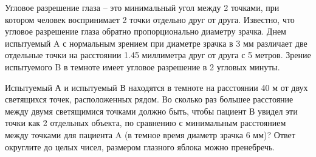 
Угловое разрешение глаза – это минимальный угол
между 2 точками, при котором человек воспринимает 2 точки отдельно друг от
друга. Известно, что угловое разрешение глаза обратно пропорционально диаметру
зрачка. Днем испытуемый A с нормальным зрением при диаметре зрачка в 3  мм
различает две отдельные точки на расстоянии 1.45  миллиметра друг от друга с 5 
метров. Зрение испытуемого B в темноте имеет угловое разрешение в 2  угловых
минуты.

Испытуемый А и испытуемый В находятся в темноте на
расстоянии 40  м от двух светящихся точек, расположенных рядом.  Во сколько раз большее расстояние между двумя
светящимися точками должно быть, чтобы пациент В увидел эти точки как 2
отдельных объекта, по сравнению с минимальным расстоянием между точками для
пациента A (в темное время диаметр зрачка 6 мм)? Ответ округлите до целых
чисел, размером глазного яблока можно пренебречь.

\explanationSection

